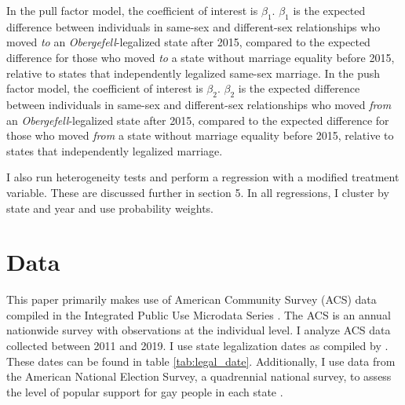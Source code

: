 \documentclass[12pt,letterpaper]{article}
\begin{document}


In the pull factor model, the coefficient of interest is $\beta_1$. $\beta_1$ is the expected difference between individuals in same-sex and different-sex relationships who moved \textit{to} an \textit{Obergefell}-legalized state after 2015, compared to the expected difference for those who moved \textit{to} a state without marriage equality before 2015, relative to states that independently legalized same-sex marriage. In the push factor model, the coefficient of interest is $\beta_2$. $\beta_2$ is the expected difference between individuals in same-sex and different-sex relationships who moved \textit{from} an \textit{Obergefell}-legalized state after 2015, compared to the expected difference for those who moved \textit{from} a state without marriage equality before 2015, relative to states that independently legalized marriage. 

I also run heterogeneity tests and perform a regression with a modified treatment variable. These are discussed further in section 5. In all regressions, I cluster by state and year and use probability weights. 

\section{Data}

This paper primarily makes use of American Community Survey (ACS) data compiled in the Integrated Public Use Microdata Series \citep{28}. The ACS is an annual nationwide survey with observations at the individual level. I analyze ACS data collected between 2011 and 2019. I use state legalization dates as compiled by \citet{27}. These dates can be found in table \ref{tab:legal_date}. Additionally, I use data from the American National Election Survey, a quadrennial national survey, to assess the level of popular support for gay people in each state \citep{29}.


\end{document}
